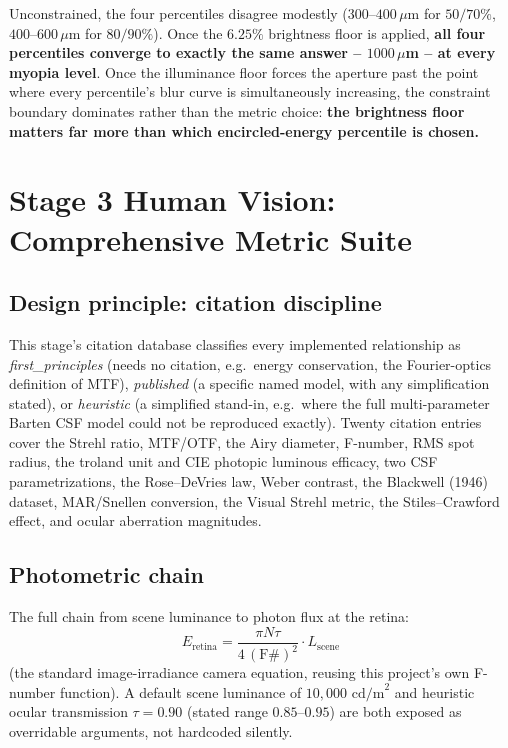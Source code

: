 \documentclass[11pt]{report}
\begin{document}
Unconstrained, the four percentiles disagree modestly ($300$--$400\,\mu$m for $50/70\%$, $400$--$600\,\mu$m for $80/90\%$). Once the $6.25\%$ brightness floor is applied, \textbf{all four percentiles converge to exactly the same answer -- $1000\,\mu$m -- at every myopia level}. Once the illuminance floor forces the aperture past the point where every percentile's blur curve is simultaneously increasing, the constraint boundary dominates rather than the metric choice: \textbf{the brightness floor matters far more than which encircled-energy percentile is chosen.}

\chapter{Stage 3 Human Vision: Comprehensive Metric Suite}
\label{ch:stage3hv}

\section{Design principle: citation discipline}
\label{sec:literature-discipline}
This stage's citation database classifies every implemented relationship as \emph{first\_principles} (needs no citation, e.g.\ energy conservation, the Fourier-optics definition of MTF), \emph{published} (a specific named model, with any simplification stated), or \emph{heuristic} (a simplified stand-in, e.g.\ where the full multi-parameter Barten CSF model could not be reproduced exactly). Twenty citation entries cover the Strehl ratio, MTF/OTF, the Airy diameter, F-number, RMS spot radius, the troland unit and CIE photopic luminous efficacy, two CSF parametrizations, the Rose--DeVries law, Weber contrast, the Blackwell (1946) dataset, MAR/Snellen conversion, the Visual Strehl metric, the Stiles--Crawford effect, and ocular aberration magnitudes.

\section{Photometric chain}
The full chain from scene luminance to photon flux at the retina:
\begin{equation}
E_{\text{retina}} = \frac{\pi N \tau}{4\,(\text{F\#})^2} \cdot L_{\text{scene}}
\label{eq:retinalirradiance}
\end{equation}
(the standard image-irradiance camera equation, reusing this project's own F-number function). A default scene luminance of $10{,}000\text{ cd/m}^2$ and heuristic ocular transmission $\tau=0.90$ (stated range $0.85$--$0.95$) are both exposed as overridable arguments, not hardcoded silently.
\end{document}
